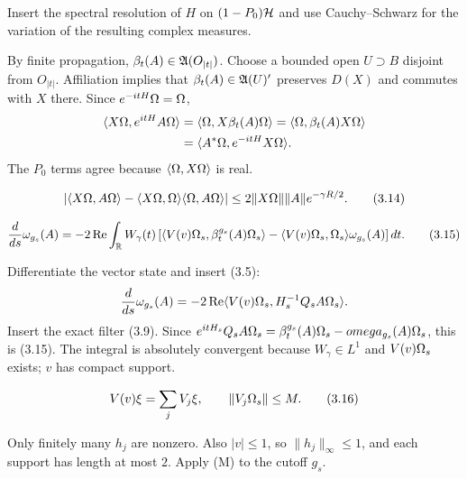 \documentclass[11pt,a4paper]{article}
\begin{document}
\Because Insert the spectral resolution of $H$ on $(1-P_0)\mathcal H$ and use
Cauchy--Schwarz for the variation of the resulting complex measures.


\Because By finite propagation, $\beta_t(A)\in\mathfrak A(O_{|t|})$.  Choose a bounded
open $U\supset B$ disjoint from $O_{|t|}$.  Affiliation implies that
$\beta_t(A)\in\mathfrak A(U)'$ preserves $D(X)$ and commutes with $X$ there.  Since
$e^{-itH}\Omega=\Omega$,
\begin{align*}
 \langle X\Omega,e^{itH}A\Omega\rangle
 &=\langle \Omega,X\beta_t(A)\Omega\rangle
  =\langle \Omega,\beta_t(A)X\Omega\rangle\\
 &=\langle A^*\Omega,e^{-itH}X\Omega\rangle.
\end{align*}
The $P_0$ terms agree because $\langle \Omega,X\Omega\rangle$ is real.

\[
 \left|\langle X\Omega,A\Omega\rangle-\langle X\Omega,\Omega\rangle\langle \Omega,A\Omega\rangle\right|
 \leq2\|X\Omega\|\|A\|e^{-\gamma R/2}.                              \tag{3.14}
\]

\QedStep


\[
 \frac d{ds}\omega_{g_s}(A)
 =-2\operatorname{Re}\int_\mathbb R W_\gamma(t)
 \left[\langle V(v)\Omega_s,\beta_t^{g_s}(A)\Omega_s\rangle
 -\langle V(v)\Omega_s,\Omega_s\rangle\omega_{g_s}(A)\right]dt.                 \tag{3.15}
\]

\Because Differentiate the vector state and insert (3.5):
\[
 \frac d{ds}\omega_{g_s}(A)
 =-2\operatorname{Re}\langle V(v)\Omega_s,H_s^{-1}Q_sA\Omega_s\rangle.
\]
Insert the exact filter (3.9).  Since
$e^{itH_s}Q_sA\Omega_s=\beta_t^{g_s}(A)\Omega_s-omega_{g_s}(A)\Omega_s$,
this is (3.15).  The integral is absolutely convergent because
$W_\gamma\in L^1$ and $V(v)\Omega_s$ exists; $v$ has compact support.

\[
 V(v)\xi=\sum_jV_j\xi,\qquad \|V_j\Omega_s\|\leq M.                  \tag{3.16}
\]

\Because Only finitely many $h_j$ are nonzero.  Also $|v|\leq1$, so
$\|h_j\|_\infty\leq1$, and each support has length at most $2$.  Apply (M) to
the cutoff $g_s$.

\QedStep

\end{document}
